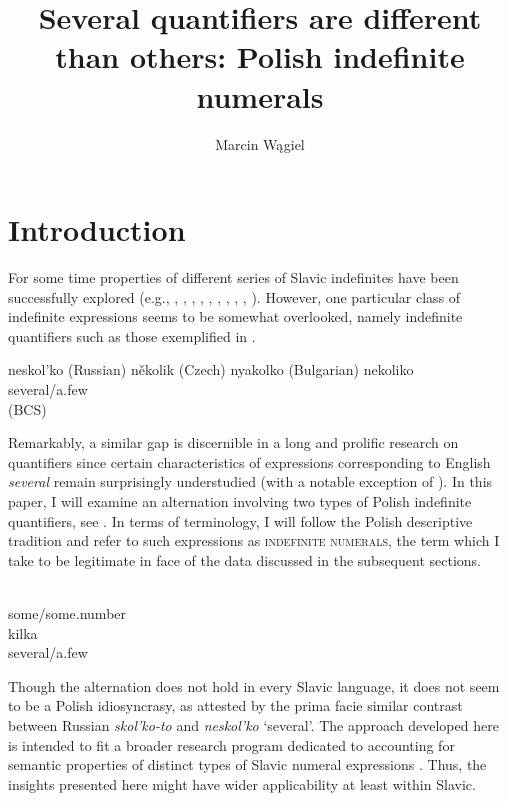 \documentclass[output=paper,
]{langscibook}
\title{Several quantifiers are different than others: Polish indefinite numerals}
\author{Marcin Wągiel\affiliation{Masaryk University in Brno}}
\begin{document}
	\maketitle
	
	\section{Introduction}\label{introduction}

	For some time properties of different series of Slavic indefinites have been successfully explored (e.g., \citealt{blaszczak2001investigation}, \citealt{testelets_bylinina2005sluicing}, \citealt{yanovich2005choice}, \citealt{geist2008specificity}, \citealt{pereltsvaig2008russian}, \citealt{eremina2012semantics}, \citealt{docekal_strachonova2015freedom}, \citealt{richtarcikova2015epistemic}, \citealt{simik2015epistemic}, \citealt{strachonova2016ceska}). However, one particular class of indefinite expressions seems to be somewhat overlooked, namely indefinite quantifiers such as those exemplified in . 
	
	\ea \label{ex:slavic-indefinite-quantifiers} \ea neskol'ko \hfill (Russian)
	\ex několik \hfill (Czech)
	\ex nyakolko \hfill (Bulgarian)
	\ex \gll nekoliko\\ 
	several/a.few\\ \hfill (BCS)
    \z
    \z
	
	\noindent Remarkably, a similar gap is discernible in a long and prolific research on quantifiers since certain characteristics of expressions corresponding to English \textit{several} remain surprisingly understudied (with a notable exception of \citealt{kayne2007several}). In this paper, I will examine an alternation involving two types of Polish indefinite quantifiers, see . In terms of terminology, I will follow the Polish descriptive tradition and refer to such expressions as \textsc{indefinite numerals}, the term which I take to be legitimate in face of the data discussed in the subsequent sections. 
	
	\ea \label{ex:polish-indefinite-quantifiers} \ea \gll {}\\
	some/some.number\\
	\ex \gll kilka\\
	several/a.few\\
    \z
    \z
	
	\noindent Though the alternation does not hold in every Slavic language, it does not seem to be a Polish idiosyncrasy, as attested by the prima facie similar contrast between Russian \textit{skol'ko-to} and \textit{neskol'ko} `several'. The approach developed here is intended to fit a broader research program dedicated to accounting for semantic properties of distinct types of Slavic numeral expressions \citep{docekal2012atoms,docekal2013numerals,wagiel2014boys,wagiel2015sums,wagiel-toappear-entities,docekal_wagiel2018event}.  %
	Thus, the insights presented here might have wider applicability at least within Slavic.
	
\end{document}
